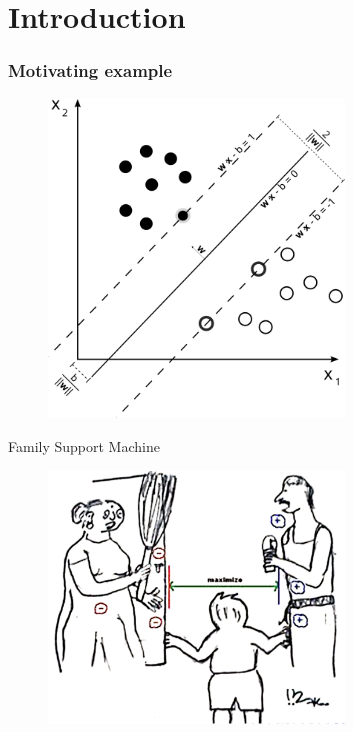 \section{Introduction}
\begin{frame}[fragile]
    \frametitle{Motivating example}
    \begin{figure}[htbp]
        \centering
        \includegraphics[height=0.8\textheight, width=0.7\textwidth]{images/svm_ex.png}
    \end{figure}
\end{frame}

\begin{frame}{Family Support Machine}
    \begin{figure}[htbp]
        \centering
        \includegraphics[height=0.7\textheight, width=0.7\textwidth]{images/family.png}
    \end{figure}
\end{frame}

